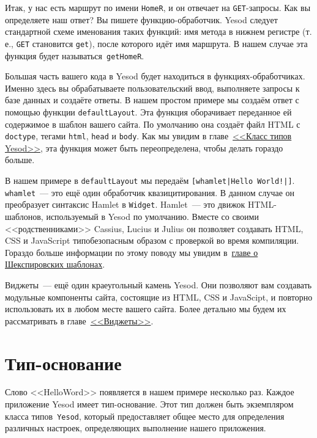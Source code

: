 Итак, у нас есть маршрут по имени \lstinline!HomeR!, и он отвечает на \texttt{GET}-запросы.  Как вы
определяете наш ответ? Вы пишете функцию-обработчик. Yesod следует стандартной схеме
именования таких функций: имя метода в нижнем регистре (т. е., \texttt{GET} становится
\lstinline!get!), после которого идёт имя маршрута. В нашем случае эта функция будет
называться~\lstinline!getHomeR!.

Большая часть вашего кода в Yesod будет находиться в функциях-обработчиках.  Именно здесь
вы обрабатываете пользовательский ввод, выполняете запросы к базе данных и создаёте
ответы. В нашем простом примере мы создаём ответ с помощью функции
\lstinline!defaultLayout!. Эта функция оборачивает переданное ей содержимое в шаблон
вашего сайта. По умолчанию она создаёт файл HTML с \texttt{doctype}, тегами \texttt{html}, \texttt{head} и \texttt{body}. Как
мы увидим в главе~\hyperref[chap:yesod-typeclass]{<<Класс типов Yesod>>}, эта функция может
быть переопределена, чтобы делать гораздо больше.

В нашем примере в \lstinline!defaultLayout! мы передаём
\lstinline'[whamlet|Hello World!|]'. \lstinline!whamlet!~--- это ещё один обработчик
квазицитирования. В данном случае он преобразует синтаксис Hamlet в
\lstinline{Widget}. Hamlet~--- это движок HTML-шаблонов, используемый в Yesod по умолчанию.
Вместе со своими <<родственниками>> Cassius, Lucius и Julius он позволяет создавать HTML,
CSS и JavaScript типобезопасным образом с проверкой во время компиляции. Гораздо больше
информации по этому поводу мы увидим в~\hyperref[chap:shakespeare]{главе о Шекспировских шаблонах}.

Виджеты~--- ещё один краеугольный камень Yesod. Они позволяют вам создавать
модульные компоненты сайта, состоящие из HTML, CSS и JavaScipt,
и повторно использовать их в любом месте вашего сайта. Более детально мы будем их
рассматривать в главе~\hyperref[chap:widgets]{<<Виджеты>>}.

\section{Тип-основание}

Слово <<HelloWord>> появляется в нашем примере несколько раз. Каждое приложение Yesod
имеет тип-основание. Этот тип должен быть экземпляром класса типов~\lstinline!Yesod!,
который предоставляет общее место для определения различных настроек, определяющих
выполнение нашего приложения.

